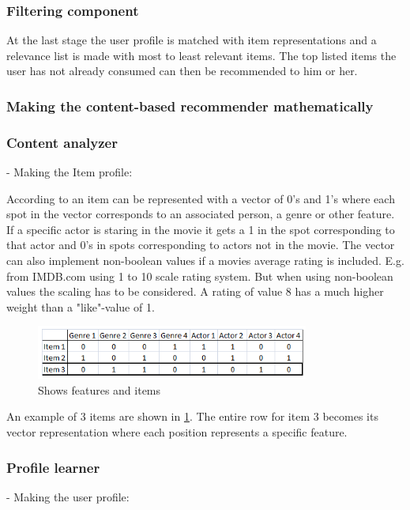 \subsubsection{Filtering component}
At the last stage the user profile is matched with item representations and a relevance list is made with most to least relevant items. The top listed items the user has not already consumed can then be recommended to him or her.
 
\subsubsection{Making the content-based recommender mathematically}

\subsubsection{Content analyzer}
- Making the Item profile:
 
According to \cite{MoMDatasets} an item can be represented with a vector of 0's and 1's where each spot in the vector corresponds to an associated person, a genre or other feature. If a specific actor is staring in the movie it gets a 1 in the spot corresponding to that actor and 0's in spots corresponding to actors not in the movie. The vector can also implement non-boolean values if a movies average rating is included. E.g. from IMDB.com using 1 to 10 scale rating system. But when using non-boolean values the scaling has to be considered. A rating of value 8 has a much higher weight than a "like"-value of 1.

\begin{figure}[H]
\centering
\includegraphics[width=0.8\textwidth]{Images/Vectorrepresentationitems.png}
\caption{Shows features and items}
\label{VrepItem}
\end{figure}

An example of 3 items are shown in \ref{VrepItem}. The entire row for item 3 becomes its vector representation where each position represents a specific feature.  
 
\subsubsection{Profile learner}
- Making the user profile:

